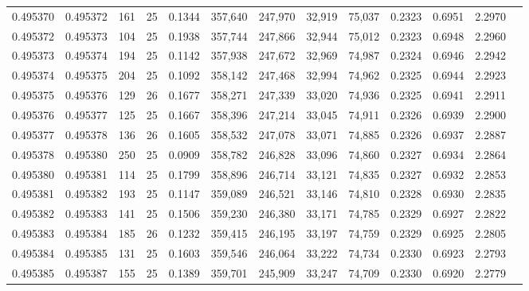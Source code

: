 \begin{tabular}{rrrrrrrrrrrrr}
0.495370 & 0.495372 &   161 &  25 &                                     0.1344 & 357,640 & 247,970 &  32,919 &  75,037 & 0.2323 & 0.6951 & 2.2970 \\
0.495372 & 0.495373 &   104 &  25 &                                     0.1938 & 357,744 & 247,866 &  32,944 &  75,012 & 0.2323 & 0.6948 & 2.2960 \\
0.495373 & 0.495374 &   194 &  25 &                                     0.1142 & 357,938 & 247,672 &  32,969 &  74,987 & 0.2324 & 0.6946 & 2.2942 \\
0.495374 & 0.495375 &   204 &  25 &                                     0.1092 & 358,142 & 247,468 &  32,994 &  74,962 & 0.2325 & 0.6944 & 2.2923 \\
0.495375 & 0.495376 &   129 &  26 &                                     0.1677 & 358,271 & 247,339 &  33,020 &  74,936 & 0.2325 & 0.6941 & 2.2911 \\
0.495376 & 0.495377 &   125 &  25 &                                     0.1667 & 358,396 & 247,214 &  33,045 &  74,911 & 0.2326 & 0.6939 & 2.2900 \\
0.495377 & 0.495378 &   136 &  26 &                                     0.1605 & 358,532 & 247,078 &  33,071 &  74,885 & 0.2326 & 0.6937 & 2.2887 \\
0.495378 & 0.495380 &   250 &  25 &                                     0.0909 & 358,782 & 246,828 &  33,096 &  74,860 & 0.2327 & 0.6934 & 2.2864 \\
0.495380 & 0.495381 &   114 &  25 &                                     0.1799 & 358,896 & 246,714 &  33,121 &  74,835 & 0.2327 & 0.6932 & 2.2853 \\
0.495381 & 0.495382 &   193 &  25 &                                     0.1147 & 359,089 & 246,521 &  33,146 &  74,810 & 0.2328 & 0.6930 & 2.2835 \\
0.495382 & 0.495383 &   141 &  25 &                                     0.1506 & 359,230 & 246,380 &  33,171 &  74,785 & 0.2329 & 0.6927 & 2.2822 \\
0.495383 & 0.495384 &   185 &  26 &                                     0.1232 & 359,415 & 246,195 &  33,197 &  74,759 & 0.2329 & 0.6925 & 2.2805 \\
0.495384 & 0.495385 &   131 &  25 &                                     0.1603 & 359,546 & 246,064 &  33,222 &  74,734 & 0.2330 & 0.6923 & 2.2793 \\
0.495385 & 0.495387 &   155 &  25 &                                     0.1389 & 359,701 & 245,909 &  33,247 &  74,709 & 0.2330 & 0.6920 & 2.2779 \\

\end{tabular}
